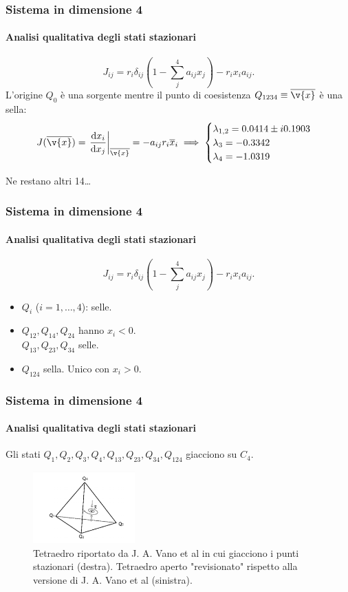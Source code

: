\begin{frame}
\frametitle{Sistema in dimensione 4}
\framesubtitle{Analisi qualitativa degli stati stazionari}
\[
    J_{ij} = r_i \delta_{ij}\left(1-\sum_{j}^{4} a_{ij}x_j\right) - r_ix_ia_{ij}
.\] 
L'origine $Q_0$ è una sorgente mentre il punto di coesistenza $Q_{1234} \equiv \overline{\v{x}}$ è una sella:
\[
    J(\overline{\v{x}}) = \left.\frac{\text{d} x_i}{\text{d} x_j}\right|_{\overline{\v{x}}} = - a_{ij}r_i\overline{x}_i \implies 
	\begin{cases}
	    \lambda_{1,2}=0.0414 \pm i 0.1903\\
	    \lambda_3 = -0.3342 \\
	    \lambda_4 = -1.0319
	\end{cases}
\] 
\begin{center}
Ne restano altri 14\ldots
\end{center}
\end{frame}

\begin{frame}
\frametitle{Sistema in dimensione 4}
\framesubtitle{Analisi qualitativa degli stati stazionari}
\[
    J_{ij} = r_i \delta_{ij}\left(1-\sum_{j}^{4} a_{ij}x_j\right) - r_ix_ia_{ij}
.\]
\begin{itemize}
    \item $Q_i$ ($i = 1, \ldots, 4$): selle.
    \item $Q_{12}, Q_{14}, Q_{24}$ hanno $x_i < 0$.\\
	$Q_{13}, Q_{23}, Q_{34}$ selle.
    \item $Q_{124}$ sella. Unico con $x_i > 0$.
\end{itemize}
\end{frame}

\begin{frame}
\frametitle{Sistema in dimensione 4}
\framesubtitle{Analisi qualitativa degli stati stazionari}
\vspace{1em}
Gli stati $Q_1, Q_2, Q_3, Q_4, Q_{13}, Q_{23}, Q_{34}, Q_{124}$ giacciono su $C_4$.
\begin{figure}[H]
    \centering
    \includegraphics[width=0.35\textwidth]{figures/tetra.png}
    \def\svgwidth{0.45\columnwidth}
    
    \caption{\scriptsize Tetraedro riportato da J. A. Vano et al in cui giacciono i punti stazionari (destra). Tetraedro aperto "revisionato" rispetto alla versione di J. A. Vano et al (sinistra).}
    \label{fig:figures-tetra_open-png}
\end{figure}
\end{frame}
